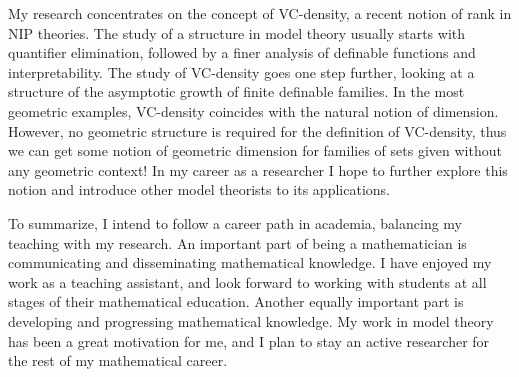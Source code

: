 \documentclass[11pt]{article}
\begin{document}
My research concentrates on the concept of VC-density, a recent notion of rank in NIP theories. The study of a structure in model theory usually starts with quantifier elimination, followed by a finer analysis of definable functions and interpretability. The study of VC-density goes one step further, looking at a structure of the asymptotic growth of finite definable families. In the most geometric examples, VC-density coincides with the natural notion of dimension. However, no geometric structure is required for the definition of VC-density, thus we can get some notion of geometric dimension for families of sets given without any geometric context! In my career as a researcher I hope to further explore this notion and introduce other model theorists to its applications.

To summarize, I intend to follow a career path in academia, balancing my teaching with my research. An important part of being a mathematician is communicating and disseminating mathematical knowledge. I have enjoyed my work as a teaching assistant, and look forward to working with students at all stages of their mathematical education. Another equally important part is developing and progressing mathematical knowledge. My work in model theory has been a great motivation for me, and I plan to stay an active researcher for the rest of my mathematical career.
\end{document}
